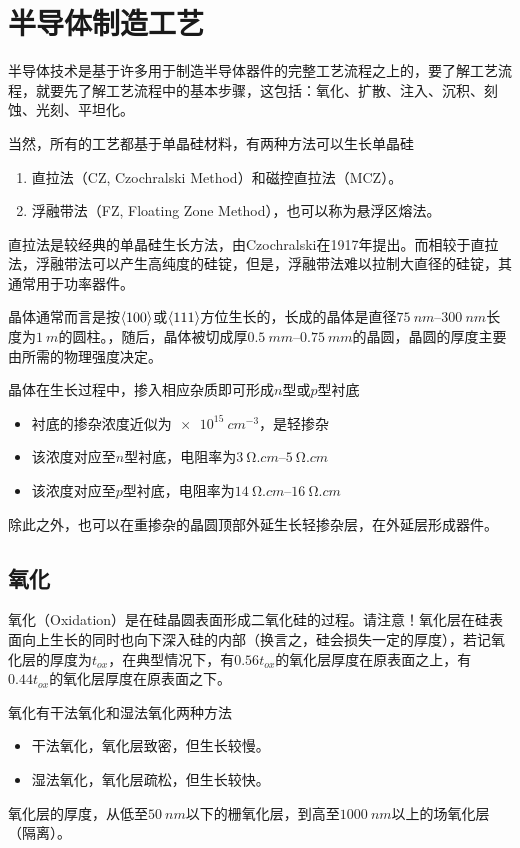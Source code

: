 \section{半导体制造工艺}
半导体技术是基于许多用于制造半导体器件的完整工艺流程之上的，要了解工艺流程，就要先了解工艺流程中的基本步骤，这包括：氧化、扩散、注入、沉积、刻蚀、光刻、平坦化。

当然，所有的工艺都基于单晶硅材料，有两种方法可以生长单晶硅
\begin{enumerate}
    \item 直拉法（CZ, Czochralski Method）和磁控直拉法（MCZ）。
    \item 浮融带法（FZ, Floating Zone Method），也可以称为悬浮区熔法。
\end{enumerate}
直拉法是较经典的单晶硅生长方法，由Czochralski在1917年提出。而相较于直拉法，浮融带法可以产生高纯度的硅锭，但是，浮融带法难以拉制大直径的硅锭，其通常用于功率器件。

晶体通常而言是按$\<100>$或$\<111>$方位生长的，长成的晶体是直径$\SIrange{75}{300}{nm}$长度为$\SI{1}{m}$的圆柱。，随后，晶体被切成厚$\SIrange{0.5}{0.75}{mm}$的晶圆，晶圆的厚度主要由所需的物理强度决定。

晶体在生长过程中，掺入相应杂质即可形成$n$型或$p$型衬底
\begin{itemize}
    \item 衬底的掺杂浓度近似为$\SI{e15}{cm^{-3}}$，是轻掺杂
    \item 该浓度对应至$n$型衬底，电阻率为$\SIrange{3}{5}{\ohm.cm}$
    \item 该浓度对应至\hspace{0.4em}$p$\hspace{0.4em}型衬底，电阻率为$\SIrange{14}{16}{\ohm.cm}$
\end{itemize}
除此之外，也可以在重掺杂的晶圆顶部外延生长轻掺杂层，在外延层形成器件。

\subsection{氧化}
氧化（Oxidation）是在硅晶圆表面形成二氧化硅的过程。请注意！氧化层在硅表面向上生长的同时也向下深入硅的内部（换言之，硅会损失一定的厚度），若记氧化层的厚度为$t_{ox}$，在典型情况下，有$0.56t_{ox}$的氧化层厚度在原表面之上，有$0.44t_{ox}$的氧化层厚度在原表面之下。

氧化有干法氧化和湿法氧化两种方法
\begin{itemize}
    \item 干法氧化，氧化层致密，但生长较慢。
    \item 湿法氧化，氧化层疏松，但生长较快。
\end{itemize}
氧化层的厚度，从低至$\SI{50}{nm}$以下的栅氧化层，到高至$\SI{1000}{nm}$以上的场氧化层（隔离）。

